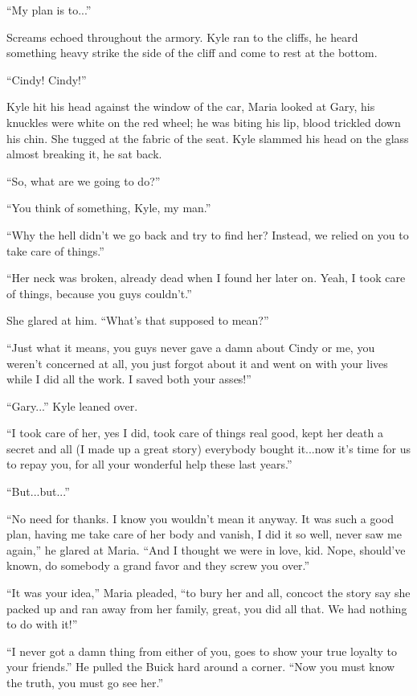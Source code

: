 \documentclass[
]{article}
\begin{document}
``My plan is to...''

Screams echoed throughout the armory. Kyle ran to the cliffs, he heard
something heavy strike the side of the cliff and come to rest at the
bottom.

``Cindy! Cindy!''

Kyle hit his head against the window of the car, Maria looked at Gary,
his knuckles were white on the red wheel; he was biting his lip, blood
trickled down his chin. She tugged at the fabric of the seat. Kyle
slammed his head on the glass almost breaking it, he sat back.

``So, what are we going to do?''

``You think of something, Kyle, my man.''

``Why the hell didn't we go back and try to find her? Instead, we relied
on you to take care of things.''

``Her neck was broken, already dead when I found her later on. Yeah, I
took care of things, because you guys couldn't.''

She glared at him. ``What's that supposed to mean?''

``Just what it means, you guys never gave a damn about Cindy or me, you
weren't concerned at all, you just forgot about it and went on with your
lives while I did all the work. I saved both your asses!''

``Gary...'' Kyle leaned over.

``I took care of her, yes I did, took care of things real good, kept her
death a secret and all (I made up a great story) everybody bought
it...now it's time for us to repay you, for all your wonderful help
these last years.''

``But...but...''

``No need for thanks. I know you wouldn't mean it anyway. It was such a
good plan, having me take care of her body and vanish, I did it so well,
never saw me again,'' he glared at Maria. ``And I thought we were in
love, kid. Nope, should've known, do somebody a grand favor and they
screw you over.''

``It was your idea,'' Maria pleaded, ``to bury her and all, concoct the
story say she packed up and ran away from her family, great, you did all
that. We had nothing to do with it!''

``I never got a damn thing from either of you, goes to show your true
loyalty to your friends.'' He pulled the Buick hard around a corner.
``Now you must know the truth, you must go see her.''
\end{document}
